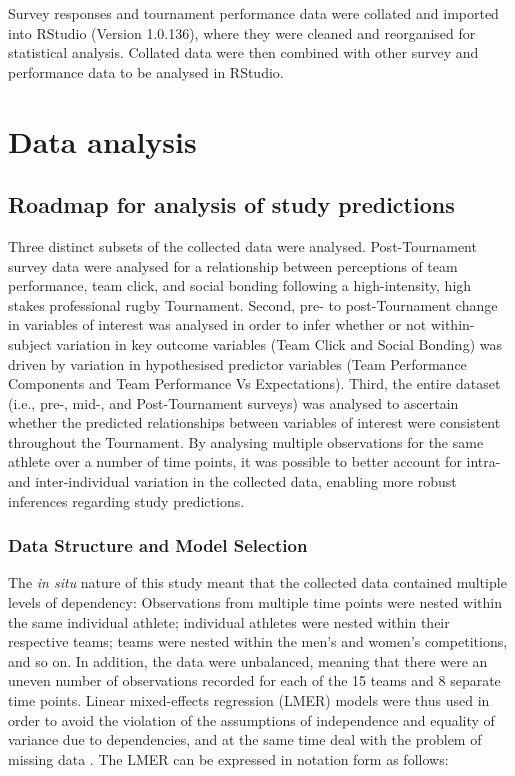 \begin{CJK}{UTF8}{gbsn}
Survey responses and tournament performance data were collated and imported into RStudio (Version 1.0.136), where they were cleaned and reorganised for statistical analysis. Collated data were then combined with other survey and performance data to be analysed in RStudio.






\clearpage
\section{Data analysis}



\subsection{Roadmap for analysis of study predictions}
Three distinct subsets of the collected data were analysed. Post-Tournament survey data were analysed for a relationship between perceptions of team performance, team click, and social bonding following a high-intensity, high stakes professional rugby Tournament.  Second, pre- to post-Tournament change in variables of interest was analysed in order to infer whether or not within-subject variation in key outcome variables (Team Click and Social Bonding) was driven by variation in hypothesised predictor variables (Team Performance Components and Team Performance Vs Expectations). Third, the entire dataset (i.e., pre-, mid-, and Post-Tournament surveys) was analysed to ascertain whether the predicted relationships between variables of interest were consistent throughout the Tournament.  By analysing multiple observations for the same athlete over a number of time points, it was possible to better account for intra- and inter-individual variation in the collected data, enabling more robust inferences regarding study predictions.

\subsubsection{Data Structure and Model Selection\label{survey:dataStructureModelSelection}}
The \textit{in situ} nature of this study meant that the collected data contained multiple levels of dependency: Observations from multiple time points were nested within the same individual athlete; individual athletes were nested within their respective teams; teams were nested within the men’s and women’s competitions, and so on.  In addition, the data were unbalanced, meaning that there were an uneven number of observations recorded for each of the 15 teams and 8 separate time points. Linear mixed-effects regression (LMER) models were thus used in order to avoid the violation of the assumptions of independence and equality of variance due to dependencies, and at the same time deal with the problem of missing data \citep{Quene2004,Field2012}.  The LMER can be expressed in notation form as follows:



\end{CJK}
